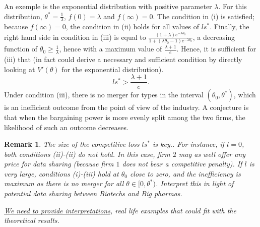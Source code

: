 \documentclass[a4paper]{article}
\newtheorem{remark}{Remark}
\renewcommand{\t}{\theta}
\begin{document}
%
An exemple is the exponential distribution with positive parameter $\lambda$. For this distribution, $\t^*=\frac{1}{\lambda}$, $f(0)=\lambda$ and $f(\infty)=0$. The condition in (i) is satisfied; because $f(\infty)=0$, the condition in (ii) holds for all values of $ls^*$. Finally, the right hand side in condition in (iii) is equal to $\frac{(1+\lambda) e^{-\lambda \t_0}}{1+(\lambda \t_0-1)e^{-\lambda \t_0}}$, a decreasing function of $\t_0\geq \frac{1}{\lambda}$, hence with a maximum value of $\frac{\lambda+1}{e}$. Hence, it is sufficient for (iii) that (in fact could derive a necessary and sufficient condition by directly looking at $V'(\t)$ for the exponential distribution).
%
\[
ls^*>\frac{\lambda+1}{e}.
\]
%
%
Under condition (iii), there is no merger for types in the interval $(\t_0,\t^*)$, which is an inefficient outcome from the point of view of the industry. A conjecture is that when the bargaining power is more evenly split among the two firms, the likelihood of such an outcome decreases.

\begin{remark}
  The size of the competitive loss $ls^*$ is key.. For instance, if $l=0$, both conditions (ii)-(ii) do not hold. In this case, firm $2$ may as well offer any price for data sharing (because firm $1$ does not bear a competitive penalty). If $l$ is very large, conditions (i)-(iii) hold at $\t_0$ close to zero, and the inefficiency is maximum as there is no merger for all $\t\in[0,\t^*)$. Interpret this in light of potential data sharing between Biotechs and Big pharmas.

  \underline{We need to provide interpretations}, real life examples that could fit with the theoretical results. 
  \end{remark}
\end{document}
